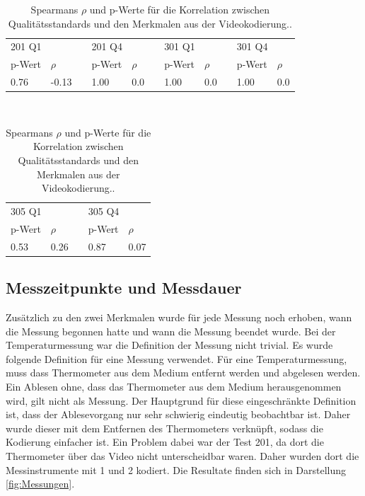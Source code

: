  \begin{table}[htbp]
   \centering
 \begin{tabular}{@{}lllllllllll@{}}
 \toprule
    \multicolumn{2}{l}{201 Q1} &&  \multicolumn{2}{l}{201 Q4}&&  \multicolumn{2}{l}{301 Q1}&&  \multicolumn{2}{l}{301 Q4} \\ 
       \cmidrule{1-2}\cmidrule{4-5}\cmidrule{7-8}\cmidrule{10-11}
    p-Wert & $\rho$ && p-Wert & $\rho$  && p-Wert & $\rho$&& p-Wert & $\rho$\\ 
 \midrule
    0.76 & -0.13 && 1.00 & 0.0 && 1.00 & 0.0 && 1.00 & 0.0     \\ 
 
 \bottomrule
 \end{tabular} \\[0.75cm]
 \begin{tabular}{@{}lllll@{}}
  \toprule
       \multicolumn{2}{l}{305 Q1}&&  \multicolumn{2}{l}{305 Q4}\\ 
        \cmidrule{1-2}\cmidrule{4-5}
      p-Wert & $\rho$&& p-Wert & $\rho$\\ 
  \midrule
      0.53 & 0.26 && 0.87 & 0.07    \\ 
  
  \bottomrule
  \end{tabular} 
   \caption{Spearmans $\rho$ und p-Werte für die Korrelation zwischen Qualitätsstandards und den Merkmalen aus der Videokodierung..  }
   \label{tab:CorVideoQ}
 \end{table}
 
  \subsection{Messzeitpunkte und Messdauer}
  
  Zusätzlich zu den zwei Merkmalen wurde für jede Messung noch erhoben, wann die Messung begonnen hatte und wann die Messung beendet wurde. Bei der Temperaturmessung war die Definition der Messung nicht trivial. Es wurde folgende Definition für eine Messung verwendet. Für eine Temperaturmessung, muss dass Thermometer aus dem Medium entfernt werden und abgelesen werden. Ein Ablesen ohne, dass das Thermometer aus dem Medium herausgenommen wird, gilt nicht als Messung. Der Hauptgrund für diese eingeschränkte Definition ist, dass der Ablesevorgang nur sehr schwierig eindeutig beobachtbar ist. Daher wurde dieser mit dem Entfernen des Thermometers verknüpft, sodass die Kodierung einfacher ist. Ein Problem dabei war der Test 201, da dort die Thermometer über das Video nicht unterscheidbar waren. Daher wurden dort die Messinstrumente mit 1 und 2 kodiert. Die Resultate finden sich in Darstellung \ref{fig:Messungen}.
  
